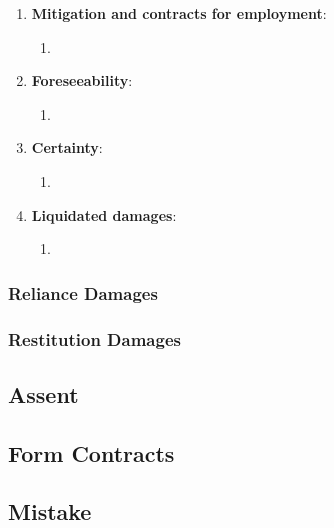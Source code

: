 \begin{enumerate}
\begin{enumerate}
        \begin{enumerate}
            \item %
        \end{enumerate}
    \end{enumerate}
    \item \textbf{Mitigation and contracts for employment}:
    \begin{enumerate}
        \item %
    \end{enumerate}
    \item \textbf{Foreseeability}:
    \begin{enumerate}
        \item %
    \end{enumerate}
    \item \textbf{Certainty}:
    \begin{enumerate}
        \item %
    \end{enumerate}
    \item \textbf{Liquidated damages}:
    \begin{enumerate}
        \item %
    \end{enumerate}
\end{enumerate}

\subsubsection{Reliance Damages}


\subsubsection{Restitution Damages}


\subsection{Assent}


\subsection{Form Contracts}


\subsection{Mistake}

